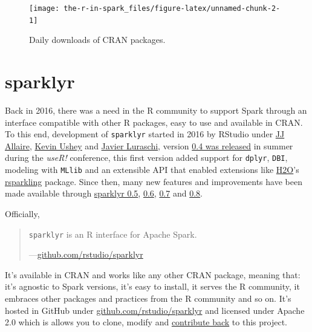\documentclass[]{book}
\theoremstyle{definition}
\theoremstyle{definition}
\theoremstyle{definition}
\theoremstyle{remark}
\begin{document}
\begin{figure}

{\centering \texttt{[image: the-r-in-spark\_files/figure-latex/unnamed-chunk-2-1]} 

}

\caption{Daily downloads of CRAN packages.}\label{fig:unnamed-chunk-2}
\end{figure}

\hypertarget{sparklyr}{%
\section{sparklyr}\label{sparklyr}}

Back in 2016, there was a need in the R community to support Spark
through an interface compatible with other R packages, easy to use and
available in CRAN. To this end, development of \texttt{sparklyr} started
in 2016 by RStudio under \href{https://github.com/jjallaire}{JJ
Allaire}, \href{https://github.com/kevinushey}{Kevin Ushey} and
\href{https://github.com/javierluraschi}{Javier Luraschi}, version
\href{https://blog.rstudio.com/2016/09/27/sparklyr-r-interface-for-apache-spark/}{0.4
was released} in summer during the \emph{useR!} conference, this first
version added support for \texttt{dplyr}, \texttt{DBI}, modeling with
\texttt{MLlib} and an extensible API that enabled extensions like
\href{https://www.h2o.ai/}{H2O}'s
\href{https://github.com/h2oai/rsparkling/}{rsparkling} package. Since
then, many new features and improvements have been made available
through
\href{https://blog.rstudio.com/2017/01/24/sparklyr-0-5/}{sparklyr 0.5},
\href{https://blog.rstudio.com/2017/07/31/sparklyr-0-6/}{0.6},
\href{https://blog.rstudio.com/2018/01/29/sparklyr-0-7/}{0.7} and
\href{https://blog.rstudio.com/2018/05/14/sparklyr-0-8/}{0.8}.

Officially,

\begin{quote}
\texttt{sparklyr} is an R interface for Apache Spark.

---\href{https://github.com/rstudio/sparklyr}{github.com/rstudio/sparklyr}
\end{quote}

It's available in CRAN and works like any other CRAN package, meaning
that: it's agnostic to Spark versions, it's easy to install, it serves
the R community, it embraces other packages and practices from the R
community and so on. It's hosted in GitHub under
\href{https://github.com/rstudio/sparklyr}{github.com/rstudio/sparklyr}
and licensed under Apache 2.0 which is allows you to clone, modify and
\protect\hyperlink{contributing}{contribute back} to this project.
\end{document}
